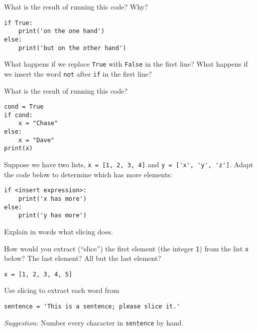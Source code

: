 \documentclass[11pt]{exam}
\begin{document}
\begin{questions}
\item What is the result of running this code?  Why?
\begin{verbatim}
if True:
    print('on the one hand')
else:
    print('but on the other hand')
\end{verbatim}
What happens if we replace {\tt True} with {\tt False} in the first line?
What happens if we insert the word {\tt not} after {\tt if} in the first line?  

\item What is the result of running this code?
\begin{verbatim}
cond = True
if cond:
    x = "Chase"
else:
    x = "Dave"
print(x)
\end{verbatim}

\item Suppose we have two lists,
{\tt x = [1, 2, 3, 4]} and \verb|y = ['x', 'y', 'z']|.
Adapt the code below to determine which has more elements:
\begin{verbatim}
if <insert expression>:
    print('x has more')
else:
    print('y has more')
\end{verbatim}



\item Explain in words what slicing does.

\item How would you extract (``slice'') the first element (the integer {\tt 1}) from the list {\tt x} below?
The last element?  All but the last element?
\begin{verbatim}
x = [1, 2, 3, 4, 5]
\end{verbatim}

\item Use slicing to extract each word from
\begin{verbatim}
sentence = 'This is a sentence; please slice it.'
\end{verbatim}
{\it Suggestion:\/} Number every character in {\tt sentence} by hand.



\end{questions}
\end{document}

